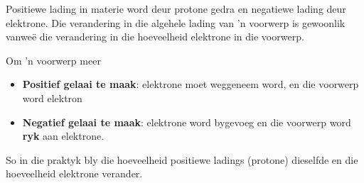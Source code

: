 \par 

Positiewe lading in materie word deur protone gedra en negatiewe lading deur elektrone. Die verandering in die algehele lading van 'n voorwerp is gewoonlik vanwe\"e die verandering in die hoeveelheid elektrone in die voorwerp.

Om 'n voorwerp meer
      \begin{itemize}
        \item \textbf{Positief gelaai te maak}: elektrone moet weggeneem word, en die voorwerp word elektron 
        \item \textbf{Negatief gelaai te maak}: elektrone word bygevoeg en die voorwerp word \textbf{ryk} aan elektrone.
      \end{itemize}

So in die praktyk bly die hoeveelheid positiewe ladings (protone) dieselfde en die hoeveelheid elektrone verander.


